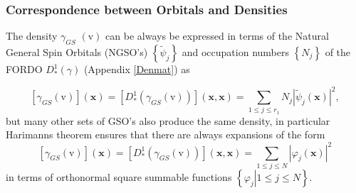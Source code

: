 \documentclass[aps,preprint]{revtex4}%
\begin{document}
\subsubsection{Correspondence between Orbitals and Densities}

The density $\gamma_{GS}$ $\left(  \mathrm{v}\right)  $ can be always be
expressed in terms of the Natural General Spin Orbitals (NGSO's) $\left\{
\tilde{\psi}_{j}\right\}  $ and occupation numbers $\left\{  N_{j}\right\}  $
of the FORDO $D_{\ast}^{1}\left(  \gamma\right)  $ (Appendix \ref{Denmat}) as%

\begin{equation}
\left[  \gamma_{GS}\left(  \mathrm{v}\right)  \right]  \left(  \boldsymbol{x}%
\right)  =\left[  D_{\ast}^{1}\left(  \gamma_{GS}\left(  \mathrm{v}\right)
\right)  \right]  \left(  \boldsymbol{x,x}\right)  =\sum_{1\leq j\leq r_{1}%
}N_{j}\left\vert \tilde{\psi}_{j}\left(  \boldsymbol{x}\right)  \right\vert
^{2}, \label{NGSOexpan}%
\end{equation}
but many other sets of GSO's also produce the same density, in particular
Harimanns \cite{Harimann} theorem ensures that there are always expansions of
the form
\begin{equation}
\left[  \gamma_{GS}\left(  \mathrm{v}\right)  \right]  \left(  \boldsymbol{x}%
\right)  =\left[  D_{\ast}^{1}\left(  \gamma_{GS}\left(  \mathrm{v}\right)
\right)  \right]  \left(  \boldsymbol{x,x}\right)  =\sum_{1\leq j\leq
N}\left\vert \varphi_{j}\left(  \boldsymbol{x}\right)  \right\vert ^{2}
\label{Genexp}%
\end{equation}
in terms of orthonormal square summable functions $\left\{  \left.
\varphi_{j}\right\vert 1\leq j\leq N\right\}  $.
\end{document}
